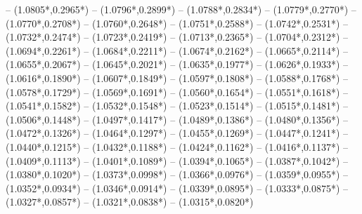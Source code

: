 {	-- ({1.0805*\dx},{0.2965*\dy})
	-- ({1.0796*\dx},{0.2899*\dy})
	-- ({1.0788*\dx},{0.2834*\dy})
	-- ({1.0779*\dx},{0.2770*\dy})
	-- ({1.0770*\dx},{0.2708*\dy})
	-- ({1.0760*\dx},{0.2648*\dy})
	-- ({1.0751*\dx},{0.2588*\dy})
	-- ({1.0742*\dx},{0.2531*\dy})
	-- ({1.0732*\dx},{0.2474*\dy})
	-- ({1.0723*\dx},{0.2419*\dy})
	-- ({1.0713*\dx},{0.2365*\dy})
	-- ({1.0704*\dx},{0.2312*\dy})
	-- ({1.0694*\dx},{0.2261*\dy})
	-- ({1.0684*\dx},{0.2211*\dy})
	-- ({1.0674*\dx},{0.2162*\dy})
	-- ({1.0665*\dx},{0.2114*\dy})
	-- ({1.0655*\dx},{0.2067*\dy})
	-- ({1.0645*\dx},{0.2021*\dy})
	-- ({1.0635*\dx},{0.1977*\dy})
	-- ({1.0626*\dx},{0.1933*\dy})
	-- ({1.0616*\dx},{0.1890*\dy})
	-- ({1.0607*\dx},{0.1849*\dy})
	-- ({1.0597*\dx},{0.1808*\dy})
	-- ({1.0588*\dx},{0.1768*\dy})
	-- ({1.0578*\dx},{0.1729*\dy})
	-- ({1.0569*\dx},{0.1691*\dy})
	-- ({1.0560*\dx},{0.1654*\dy})
	-- ({1.0551*\dx},{0.1618*\dy})
	-- ({1.0541*\dx},{0.1582*\dy})
	-- ({1.0532*\dx},{0.1548*\dy})
	-- ({1.0523*\dx},{0.1514*\dy})
	-- ({1.0515*\dx},{0.1481*\dy})
	-- ({1.0506*\dx},{0.1448*\dy})
	-- ({1.0497*\dx},{0.1417*\dy})
	-- ({1.0489*\dx},{0.1386*\dy})
	-- ({1.0480*\dx},{0.1356*\dy})
	-- ({1.0472*\dx},{0.1326*\dy})
	-- ({1.0464*\dx},{0.1297*\dy})
	-- ({1.0455*\dx},{0.1269*\dy})
	-- ({1.0447*\dx},{0.1241*\dy})
	-- ({1.0440*\dx},{0.1215*\dy})
	-- ({1.0432*\dx},{0.1188*\dy})
	-- ({1.0424*\dx},{0.1162*\dy})
	-- ({1.0416*\dx},{0.1137*\dy})
	-- ({1.0409*\dx},{0.1113*\dy})
	-- ({1.0401*\dx},{0.1089*\dy})
	-- ({1.0394*\dx},{0.1065*\dy})
	-- ({1.0387*\dx},{0.1042*\dy})
	-- ({1.0380*\dx},{0.1020*\dy})
	-- ({1.0373*\dx},{0.0998*\dy})
	-- ({1.0366*\dx},{0.0976*\dy})
	-- ({1.0359*\dx},{0.0955*\dy})
	-- ({1.0352*\dx},{0.0934*\dy})
	-- ({1.0346*\dx},{0.0914*\dy})
	-- ({1.0339*\dx},{0.0895*\dy})
	-- ({1.0333*\dx},{0.0875*\dy})
	-- ({1.0327*\dx},{0.0857*\dy})
	-- ({1.0321*\dx},{0.0838*\dy})
	-- ({1.0315*\dx},{0.0820*\dy})
}
